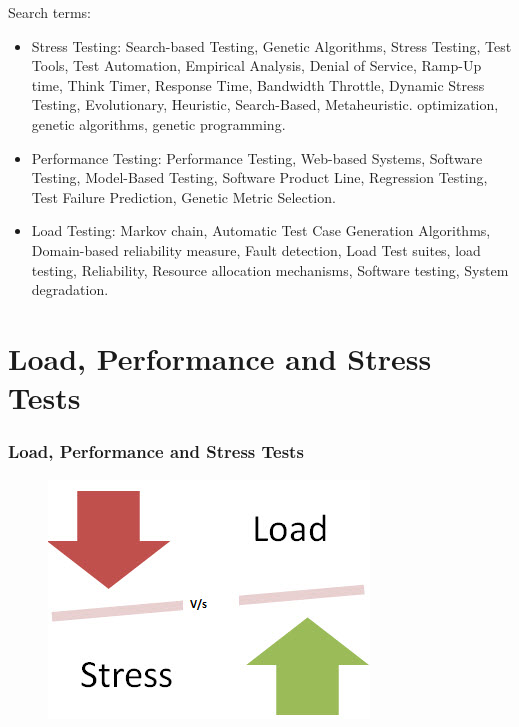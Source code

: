 \documentclass{beamer}
\begin{document}
\begin{frame}
Search terms:
\begin{itemize}
\item Stress Testing: Search-based Testing, Genetic Algorithms, Stress Testing, Test Tools, Test Automation, Empirical Analysis, Denial of Service, Ramp-Up time, Think Timer,  Response Time, Bandwidth Throttle, Dynamic Stress Testing, Evolutionary, Heuristic, Search-Based, Metaheuristic. optimization, genetic algorithms, genetic programming.

\end{itemize}
\end{frame}



\begin{frame}

\begin{itemize}
\item Performance Testing: Performance Testing, Web-based Systems, Software Testing, Model-Based Testing, Software Product Line, Regression Testing, Test Failure Prediction, Genetic Metric Selection.
\item Load Testing: Markov chain,  Automatic Test Case Generation Algorithms, Domain-based reliability measure, Fault detection, Load Test suites, load testing, Reliability, Resource allocation mechanisms, Software testing, System degradation.
\end{itemize}
\end{frame}

\section{Load, Performance and Stress Tests}

\begin{frame}
\frametitle{Load, Performance and Stress Tests}
\begin{figure}[H]
\centering
\includegraphics[width=0.7\linewidth]{StressTesting1.jpg}
\end{figure}
\end{frame}
\end{document}

